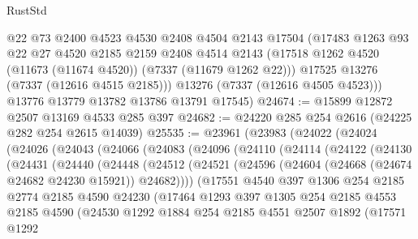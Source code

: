 \begin{lexlean}{RustStd}
\begin{coremodule}
        @22
        @73
        @2400
        @4523
        @4530
        @2408
        @4504
        @2143
        @17504
        (@17483
          @1263
          @93
          @22
          @27
          @4520
          @2185
          @2159
          @2408
          @4514
          @2143
          (@17518 @1262 @4520 (@11673 (@11674 @4520)) (@7337 (@11679 @1262 @22)))
          @17525
          @13276
          (@7337 (@12616 @4515 @2185)))
        @13276
        (@7337 (@12616 @4505 @4523)))
      @13776
      @13779
      @13782
      @13786
      @13791
      @17545)
@24674 := @15899 @12872 @2507 @13169 @4533 @285 @397
@24682 := @24220 @285 @254 @2616 (@24225 @282 @254 @2615 @14039)
@25535 := @23961
    (@23983
      (@24022
        (@24024
          (@24026
            (@24043
              (@24066
                (@24083
                  (@24096
                    (@24110
                      (@24114
                        (@24122
                          (@24130
                            (@24431
                              (@24440
                                (@24448
                                  (@24512
                                    (@24521
                                      (@24596
                                        (@24604 (@24668 (@24674 @24682 @24230 @15921)) @24682))))
                                  (@17551
                                    @4540
                                    @397
                                    @1306
                                    @254
                                    @2185
                                    @2774
                                    @2185
                                    @4590
                                    @24230
                                    (@17464
                                      @1293
                                      @397
                                      @1305
                                      @254
                                      @2185
                                      @4553
                                      @2185
                                      @4590
                                      (@24530
                                        @1292
                                        @1884
                                        @254
                                        @2185
                                        @4551
                                        @2507
                                        @1892
                                        (@17571
                                          @1292

\end{coremodule}
\end{lexlean}
